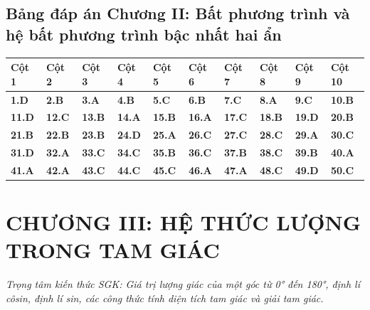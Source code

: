 \documentclass[11pt,a4paper]{article}
\begin{document}
\subsection*{\color{primary} Bảng đáp án Chương II: Bất phương trình và hệ bất phương trình bậc nhất hai ẩn}
\begin{center}
\renewcommand{\arraystretch}{1.25}
\begin{tabularx}{\textwidth}{*{10}{>{\centering\arraybackslash}X}}
\toprule
\textbf{\color{primary} Cột 1} & \textbf{\color{primary} Cột 2} & \textbf{\color{primary} Cột 3} & \textbf{\color{primary} Cột 4} & \textbf{\color{primary} Cột 5} & \textbf{\color{primary} Cột 6} & \textbf{\color{primary} Cột 7} & \textbf{\color{primary} Cột 8} & \textbf{\color{primary} Cột 9} & \textbf{\color{primary} Cột 10} \\
\midrule
\textbf{1.D} & \textbf{2.B} & \textbf{3.A} & \textbf{4.B} & \textbf{5.C} & \textbf{6.B} & \textbf{7.C} & \textbf{8.A} & \textbf{9.C} & \textbf{10.B} \\
\rowcolor{rowtint} \textbf{11.D} & \textbf{12.C} & \textbf{13.B} & \textbf{14.A} & \textbf{15.B} & \textbf{16.A} & \textbf{17.C} & \textbf{18.B} & \textbf{19.D} & \textbf{20.B} \\
\textbf{21.B} & \textbf{22.B} & \textbf{23.B} & \textbf{24.D} & \textbf{25.A} & \textbf{26.C} & \textbf{27.C} & \textbf{28.C} & \textbf{29.A} & \textbf{30.C} \\
\rowcolor{rowtint} \textbf{31.D} & \textbf{32.A} & \textbf{33.C} & \textbf{34.C} & \textbf{35.B} & \textbf{36.C} & \textbf{37.B} & \textbf{38.C} & \textbf{39.B} & \textbf{40.A} \\
\textbf{41.A} & \textbf{42.A} & \textbf{43.C} & \textbf{44.C} & \textbf{45.C} & \textbf{46.A} & \textbf{47.A} & \textbf{48.C} & \textbf{49.D} & \textbf{50.C} \\
\bottomrule
\end{tabularx}
\end{center}\vspace{10pt}
\section*{\color{primary} CHƯƠNG III: HỆ THỨC LƯỢNG TRONG TAM GIÁC}
\textit{Trọng tâm kiến thức SGK: Giá trị lượng giác của một góc từ 0° đến 180°, định lí côsin, định lí sin, các công thức tính diện tích tam giác và giải tam giác.}\par\vspace{4pt}
\end{document}
